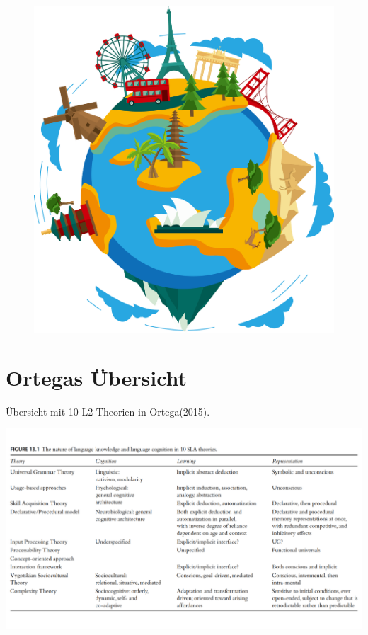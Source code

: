 \documentclass[
  letterpaper,
]{scrbook}
\begin{document}
\begin{figure}

{\centering 

\href{https://www.clipartmax.com/middle/m2i8K9H7K9H7G6b1_earth-clip-art-world-travel-clipart-png/}{\includegraphics[width=1\textwidth,height=\textheight]{./pictures/clipart66213.png}}

}

\end{figure}

\hypertarget{ortegas-uxfcbersicht}{%
\section{Ortegas Übersicht}\label{ortegas-uxfcbersicht}}

Übersicht mit 10 L2-Theorien in Ortega(2015).

\includegraphics[width=1\textwidth,height=\textheight]{./pictures/Ortega2015.png}
\end{document}

